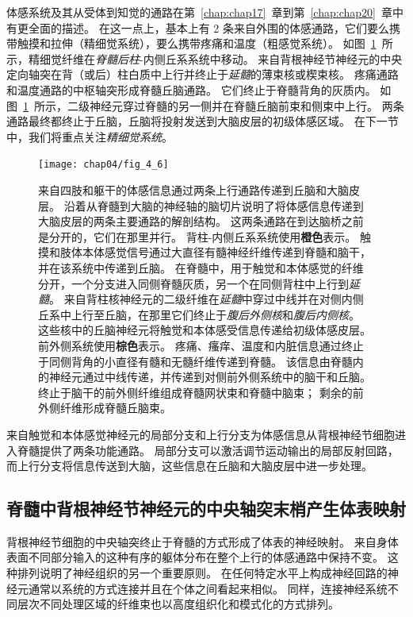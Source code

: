 体感系统及其从受体到知觉的通路在第~\ref{chap:chap17}~章到第~\ref{chap:chap20}~章中有更全面的描述。
在这一点上，基本上有 2 条来自外围的体感通路，它们要么携带触摸和拉伸（精细觉系统），要么携带疼痛和温度（粗感觉系统）。
如图~\ref{fig:4_6}~所示，精细觉纤维在\textit{脊髓后柱}-内侧丘系系统中移动。
来自背根神经节神经元的中央定向轴突在背（或后）柱白质中上行并终止于\textit{延髓}的薄束核或楔束核。
疼痛通路和温度通路的中枢轴突形成脊髓丘脑通路。
它们终止于脊髓背角的灰质内。
如图~\ref{fig:4_6}~所示，二级神经元穿过脊髓的另一侧并在脊髓丘脑前束和侧束中上行。 
两条通路最终都终止于丘脑，丘脑将投射发送到大脑皮层的初级体感区域。
在下一节中，我们将重点关注\textit{精细觉系统}。


\begin{figure}[htbp]
	\centering
	\texttt{[image: chap04/fig\_4\_6]}
	\caption{来自四肢和躯干的体感信息通过两条上行通路传递到丘脑和大脑皮层。
		沿着从脊髓到大脑的神经轴的脑切片说明了将体感信息传递到大脑皮层的两条主要通路的解剖结构。
		这两条通路在到达脑桥之前是分开的，它们在那里并行。
		背柱-内侧丘系系统使用\textbf{橙色}表示。
		触摸和肢体本体感觉信号通过大直径有髓神经纤维传递到脊髓和脑干，并在该系统中传递到丘脑。
		在脊髓中，用于触觉和本体感觉的纤维分开，一个分支进入同侧脊髓灰质，另一个在同侧背柱中上行到\textit{延髓}。 
		来自背柱核神经元的二级纤维在\textit{延髓}中穿过中线并在对侧内侧丘系中上行至丘脑，在那里它们终止于\textit{腹后外侧核}和\textit{腹后内侧核}。
		这些核中的丘脑神经元将触觉和本体感受信息传递给初级体感皮层。
		前外侧系统使用\textbf{棕色}表示。
		疼痛、瘙痒、温度和内脏信息通过终止于同侧背角的小直径有髓和无髓纤维传递到脊髓。
		该信息由脊髓内的神经元通过中线传递，并传递到对侧前外侧系统中的脑干和丘脑。
		终止于脑干的前外侧纤维组成脊髓网状束和脊髓中脑束；
		剩余的前外侧纤维形成脊髓丘脑束。}
	\label{fig:4_6}
\end{figure}


来自触觉和本体感觉神经元的局部分支和上行分支为体感信息从背根神经节细胞进入脊髓提供了两条功能通路。
局部分支可以激活调节运动输出的局部反射回路，而上行分支将信息传送到大脑，这些信息在丘脑和大脑皮层中进一步处理。



\subsection{脊髓中背根神经节神经元的中央轴突末梢产生体表映射}

背根神经节细胞的中央轴突终止于脊髓的方式形成了体表的神经映射。
来自身体表面不同部分输入的这种有序的躯体分布在整个上行的体感通路中保持不变。
这种排列说明了神经组织的另一个重要原则。
在任何特定水平上构成神经回路的神经元通常以系统的方式连接并且在个体之间看起来相似。 
同样，连接神经系统不同层次不同处理区域的纤维束也以高度组织化和模式化的方式排列。


